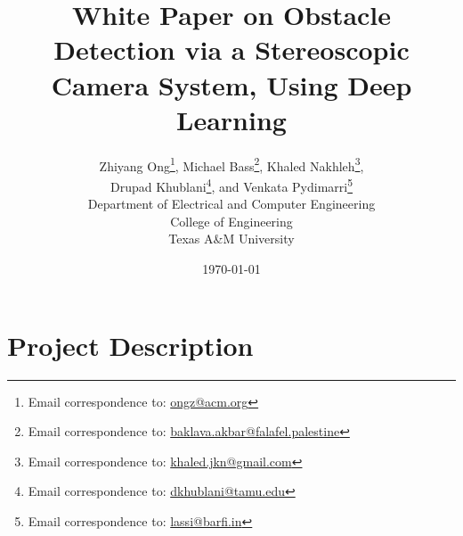 \documentclass[letter,12pt]{article}
\begin{document}
\title{White Paper on Obstacle Detection via a Stereoscopic Camera System, Using Deep Learning}
\date{\today}
\author{Zhiyang Ong\thanks{Email correspondence to: \href{mailto:ongz@acm.org}{ongz@acm.org}}, Michael Bass\thanks{Email correspondence to: \href{mailto:baklava.akbar@falafel.palestine}{baklava.akbar@falafel.palestine}}, Khaled Nakhleh\thanks{Email correspondence to: \href{mailto:khaled.jkn@gmail.com}{khaled.jkn@gmail.com}}, \\
Drupad Khublani\thanks{Email correspondence to: \href{mailto:dkhublani@tamu.edu}{dkhublani@tamu.edu}}, and Venkata Pydimarri\thanks{Email correspondence to: \href{mailto:lassi@barfi.in}{lassi@barfi.in}} \\
Department of Electrical and Computer Engineering \\
College of Engineering \\
Texas A\&M University
}
\maketitle





\section{Project Description}
\label{sec:ProjectDescription}

%
%
\end{document}
